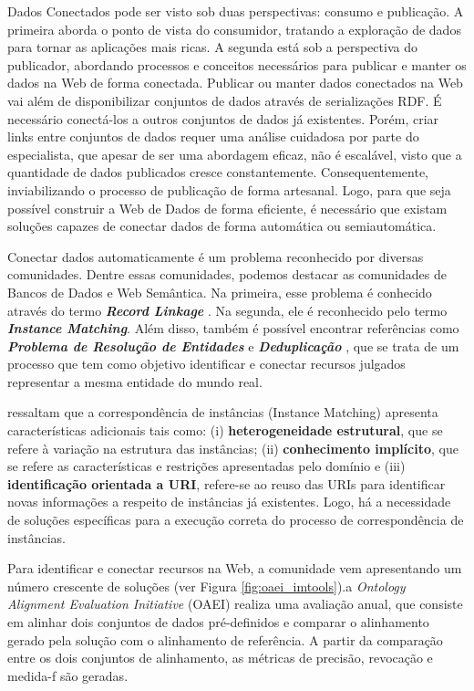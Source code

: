 Dados Conectados pode ser visto sob duas perspectivas: consumo e publicação. A primeira aborda o ponto de vista do consumidor, tratando a exploração de dados para tornar as aplicações mais ricas. A segunda está sob a perspectiva do publicador, abordando processos \cite{bizer2007publish, hyland2011joy, villazon2011methodological, Avila2015} e conceitos \cite{berners2006linked, wood2014linked} necessários para publicar e manter os dados na Web de forma conectada. 
Publicar ou manter dados conectados na Web vai além de disponibilizar conjuntos de dados através de serializações RDF. É necessário conectá-los a outros conjuntos de dados já existentes. Porém, criar links entre conjuntos de dados requer uma análise cuidadosa por parte do especialista, que apesar de ser uma abordagem eficaz, não é escalável, visto que a quantidade de dados publicados cresce constantemente. Consequentemente, inviabilizando o processo de publicação de forma artesanal. Logo, para que seja possível construir a Web de Dados de forma eficiente, é necessário que existam soluções capazes de conectar dados de forma automática ou semiautomática.

Conectar dados automaticamente é um problema reconhecido por diversas comunidades. Dentre essas comunidades, podemos destacar as comunidades de Bancos de Dados e Web Semântica. Na primeira, esse problema é conhecido através do termo \textbf{\textit{Record Linkage}} \cite{gu2003record}. Na segunda, ele é reconhecido pelo termo \textbf{\textit{Instance Matching}}. Além disso, também é possível encontrar referências como \textbf{\textit{Problema de Resolução de Entidades}} \cite{menestrina2005generic} e \textbf{\textit{Deduplicação}} \cite{sarawagi2002interactive}, que se trata de um processo que tem como objetivo identificar e conectar recursos julgados representar a mesma entidade do mundo real.

 ressaltam que a correspondência de instâncias (Instance Matching) apresenta características adicionais tais como: (i) \textbf{heterogeneidade estrutural}, que se refere à variação na estrutura das instâncias; (ii)\textbf{ conhecimento implícito}, que se refere as características e restrições  apresentadas pelo domínio e (iii) \textbf{identificação orientada a URI}, refere-se ao reuso das URIs para identificar novas informações a respeito de instâncias já existentes. Logo, há a necessidade de soluções específicas para a execução correta do processo de correspondência de instâncias. 

Para identificar e conectar recursos na Web, a comunidade vem apresentando um número crescente de soluções (ver Figura \ref{fig:oaei_imtools}).a \textit{Ontology Alignment Evaluation Initiative} (OAEI) realiza uma avaliação anual, que consiste em alinhar dois conjuntos de dados pré-definidos e comparar o alinhamento gerado pela solução com o alinhamento de referência. A partir da comparação entre os dois conjuntos de alinhamento, as métricas de precisão, revocação e medida-f são geradas.

